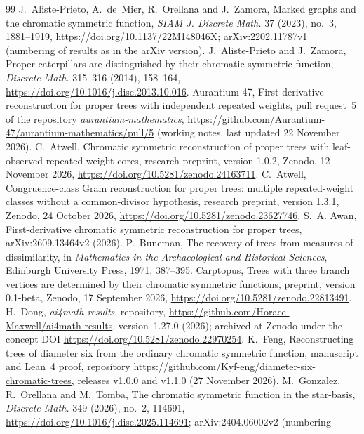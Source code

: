 \documentclass[11pt]{article}
\theoremstyle{definition}
\theoremstyle{remark}
\newcommand{\repoversion}{1.27.0}
\begin{document}
{\small
\begin{thebibliography}{99}
\setlength{\itemsep}{1pt}
 J.~Aliste-Prieto, A.~de~Mier, R.~Orellana and J.~Zamora, Marked
graphs and the chromatic symmetric function, \emph{SIAM J. Discrete Math.} 37
(2023), no.~3, 1881--1919, \url{https://doi.org/10.1137/22M148046X};
arXiv:2202.11787v1 (numbering of results as in the arXiv version).
 J.~Aliste-Prieto and J.~Zamora, Proper caterpillars are
distinguished by their chromatic symmetric function, \emph{Discrete Math.}
315--316 (2014), 158--164, \url{https://doi.org/10.1016/j.disc.2013.10.016}.
 Aurantium-47, First-derivative reconstruction for proper trees with
independent repeated weights, pull request~5 of the repository
\emph{aurantium-mathematics},
\url{https://github.com/Aurantium-47/aurantium-mathematics/pull/5} (working notes,
last updated 22 November 2026).
 C.~Atwell, Chromatic symmetric reconstruction of proper trees
with leaf-observed repeated-weight cores, research preprint, version 1.0.2,
Zenodo, 12 November 2026, \url{https://doi.org/10.5281/zenodo.24163711}.
 C.~Atwell, Congruence-class Gram reconstruction for proper
trees: multiple repeated-weight classes without a common-divisor hypothesis,
research preprint, version 1.3.1, Zenodo, 24 October 2026,
\url{https://doi.org/10.5281/zenodo.23627746}.
 S.~A. Awan, First-derivative chromatic symmetric reconstruction for
proper trees, arXiv:2609.13464v2 (2026).
 P.~Buneman, The recovery of trees from measures of
dissimilarity, in \emph{Mathematics in the Archaeological and Historical
Sciences}, Edinburgh University Press, 1971, 387--395.
 Carptopus, Trees with three branch vertices are determined by
their chromatic symmetric functions, preprint, version 0.1-beta, Zenodo,
17 September 2026, \url{https://doi.org/10.5281/zenodo.22813491}.
 H.~Dong, \emph{ai4math-results}, repository,
\url{https://github.com/Horace-Maxwell/ai4math-results}, version~\repoversion{}
(2026); archived at Zenodo under the concept DOI
\url{https://doi.org/10.5281/zenodo.22970254}.
 K.~Feng, Reconstructing trees of diameter six from the ordinary
chromatic symmetric function, manuscript and Lean~4 proof, repository
\url{https://github.com/Kyf-eng/diameter-six-chromatic-trees}, releases v1.0.0
and v1.1.0 (27 November 2026).
 M.~Gonzalez, R.~Orellana and M.~Tomba, The chromatic symmetric
function in the star-basis, \emph{Discrete Math.} 349 (2026), no.~2, 114691,
\url{https://doi.org/10.1016/j.disc.2025.114691}; arXiv:2404.06002v2 (numbering

\end{thebibliography}}
\end{document}
